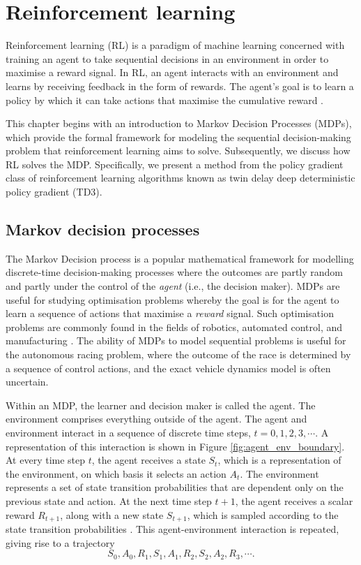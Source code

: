 \chapter{Reinforcement learning}\label{chp:rl}


Reinforcement learning (RL) is a paradigm of machine learning concerned with training an agent to take sequential decisions in an environment in order to maximise a reward signal.
In RL, an agent interacts with an environment and learns by receiving feedback in the form of rewards. 
The agent's goal is to learn a policy by which it can take actions that maximise the cumulative reward \cite{sutton2020}.


This chapter begins with an introduction to Markov Decision Processes (MDPs), which provide the formal framework for modeling the sequential decision-making problem that reinforcement learning aims to solve.
Subsequently, we discuss how RL solves the MDP.
Specifically, we present a method from the policy gradient class of reinforcement learning algorithms known as twin delay deep deterministic policy gradient (TD3).


\section{Markov decision processes}\label{sec:mdps}

The Markov Decision process is a popular mathematical framework for modelling discrete-time decision-making processes where the outcomes are partly random and partly under the control of the \emph{agent} (i.e., the decision maker).
MDPs are useful for studying optimisation problems whereby the goal is for the agent to learn a sequence of actions that maximise a \emph{reward} signal.
Such optimisation problems are commonly found in the fields of robotics, automated control, and manufacturing \cite{White1985}.
The ability of MDPs to model sequential problems is useful for the autonomous racing problem, where the outcome of the race is determined by a sequence of control actions, and the exact vehicle dynamics model is often uncertain.



Within an MDP, the learner and decision maker is called the agent.
The environment comprises everything outside of the agent.
The agent and environment interact in a sequence of discrete time steps, $t=0,1,2,3, \cdots$.
A representation of this interaction is shown in Figure \ref{fig:agent_env_boundary}.
At every time step $t$, the agent receives a state $S_t$, which is a representation of the environment, on which basis it selects an action $A_t$.
The environment represents a set of state transition probabilities that are dependent only on the previous state and action.
At the next time step $t+1$, the agent receives a scalar reward $R_{t+1}$, along with a new state $S_{t+1}$, which is sampled according to the state transition probabilities \cite{sutton2020}.
This agent-environment interaction is repeated, giving rise to a trajectory
\begin{equation}\label{eq:mdp_trajectory}
S_0, A_0, R_1, S_1, A_1, R_2, S_2, A_2, R_3, \cdots.
\end{equation}


